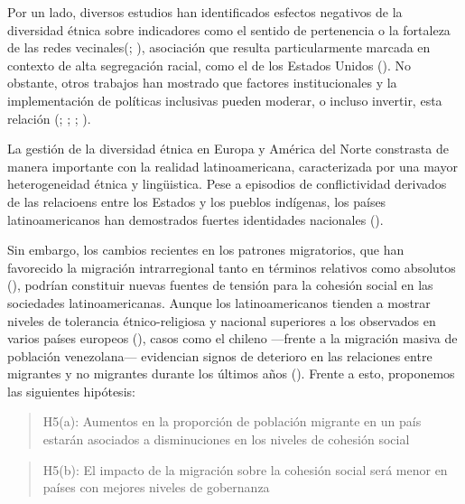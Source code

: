 \documentclass[
  spanish,
  letterpaper,
  DIV=11,
  numbers=noendperiod]{scrartcl}
\begin{document}
Por un lado, diversos estudios han identificados esfectos negativos de
la diversidad étnica sobre indicadores como el sentido de pertenencia o
la fortaleza de las redes
vecinales(; ),
asociación que resulta particularmente marcada en contexto de alta
segregación racial, como el de los Estados Unidos
(). No obstante,
otros trabajos han mostrado que factores institucionales y la
implementación de políticas inclusivas pueden moderar, o incluso
invertir, esta relación (; ;
;
).

La gestión de la diversidad étnica en Europa y América del Norte
constrasta de manera importante con la realidad latinoamericana,
caracterizada por una mayor heterogeneidad étnica y lingüistica. Pese a
episodios de conflictividad derivados de las relacioens entre los
Estados y los pueblos indígenas, los países latinoamericanos han
demostrados fuertes identidades nacionales
().

Sin embargo, los cambios recientes en los patrones migratorios, que han
favorecido la migración intrarregional tanto en términos relativos como
absolutos (), podrían
constituir nuevas fuentes de tensión para la cohesión social en las
sociedades latinoamericanas. Aunque los latinoamericanos tienden a
mostrar niveles de tolerancia étnico-religiosa y nacional superiores a
los observados en varios países europeos
(), casos
como el chileno ---frente a la migración masiva de población
venezolana--- evidencian signos de deterioro en las relaciones entre
migrantes y no migrantes durante los últimos años
().
Frente a esto, proponemos las siguientes hipótesis:

\begin{quote}
H5(a): Aumentos en la proporción de población migrante en un país
estarán asociados a disminuciones en los niveles de cohesión social
\end{quote}

\begin{quote}
H5(b): El impacto de la migración sobre la cohesión social será menor en
países con mejores niveles de gobernanza
\end{quote}
\end{document}
